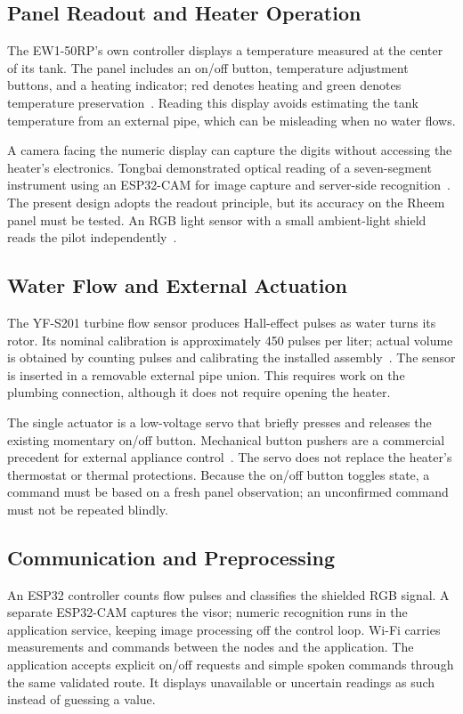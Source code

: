 \subsection{Panel Readout and Heater Operation}
The EW1-50RP's own controller displays a temperature measured at the center of its tank. The panel includes an on/off button, temperature adjustment buttons, and a heating indicator; red denotes heating and green denotes temperature preservation~\cite{rheemmanual}. Reading this display avoids estimating the tank temperature from an external pipe, which can be misleading when no water flows.

A camera facing the numeric display can capture the digits without accessing the heater's electronics. Tongbai demonstrated optical reading of a seven-segment instrument using an ESP32-CAM for image capture and server-side recognition~\cite{tongbai2024}. The present design adopts the readout principle, but its accuracy on the Rheem panel must be tested. An RGB light sensor with a small ambient-light shield reads the pilot independently~\cite{adafruitcolor}.

\subsection{Water Flow and External Actuation}
The YF-S201 turbine flow sensor produces Hall-effect pulses as water turns its rotor. Its nominal calibration is approximately 450 pulses per liter; actual volume is obtained by counting pulses and calibrating the installed assembly~\cite{seeedflow}. The sensor is inserted in a removable external pipe union. This requires work on the plumbing connection, although it does not require opening the heater.

The single actuator is a low-voltage servo that briefly presses and releases the existing momentary on/off button. Mechanical button pushers are a commercial precedent for external appliance control~\cite{switchbot}. The servo does not replace the heater's thermostat or thermal protections. Because the on/off button toggles state, a command must be based on a fresh panel observation; an unconfirmed command must not be repeated blindly.

\subsection{Communication and Preprocessing}
An ESP32 controller counts flow pulses and classifies the shielded RGB signal. A separate ESP32-CAM captures the visor; numeric recognition runs in the application service, keeping image processing off the control loop. Wi-Fi carries measurements and commands between the nodes and the application. The application accepts explicit on/off requests and simple spoken commands through the same validated route. It displays unavailable or uncertain readings as such instead of guessing a value.
